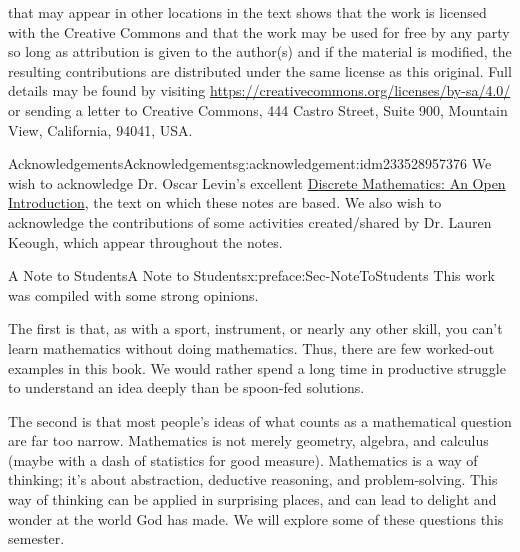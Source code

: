 \documentclass[oneside,10pt,]{book}
\numberwithin{equation}{section}
\begin{document}
 that may appear in other locations in the text shows that the work is licensed with the Creative Commons and that the work may be used for free by any party so long as attribution is given to the author(s) and if the material is modified, the resulting contributions are distributed under the same license as this original. Full details may be found by visiting \href{https://creativecommons.org/licenses/by-sa/4.0/}{https:\slash{}\slash{}creativecommons.org\slash{}licenses\slash{}by-sa\slash{}4.0\slash{}}  or sending a letter to Creative Commons, 444 Castro Street, Suite 900, Mountain View, California, 94041, USA.\par\medskip
{}
\null\clearpage
%
%
\typeout{************************************************}
\typeout{************************************************}
%
\begin{acknowledgement}{Acknowledgements}{}{Acknowledgements}{}{}{g:acknowledgement:idm233528957376}
We wish to acknowledge Dr. Oscar Levin's excellent \href{http://discrete.openmathbooks.org/dmoi3.html}{Discrete Mathematics: An Open Introduction}, the text on which these notes are based. We also wish to acknowledge the contributions of some activities created\slash{}shared by Dr. Lauren Keough, which appear throughout the notes.%
\end{acknowledgement}
%
%
\typeout{************************************************}
\typeout{************************************************}
%
\begin{preface}{A Note to Students}{}{A Note to Students}{}{}{x:preface:Sec-NoteToStudents}
This work was compiled with some strong opinions.%
\par
The first is that, as with a sport, instrument, or nearly any other skill, you can't learn mathematics without doing mathematics. Thus, there are few worked-out examples in this book. We would rather spend a long time in productive struggle to understand an idea deeply than be spoon-fed solutions.%
\par
The second is that most people's ideas of what counts as a mathematical question are far too narrow. Mathematics is not merely geometry, algebra, and calculus (maybe with a dash of statistics for good measure). Mathematics is a way of thinking; it's about abstraction, deductive reasoning, and problem-solving. This way of thinking can be applied in surprising places, and can lead to delight and wonder at the world God has made. We will explore some of these questions this semester.%
\end{preface}
\end{document}
